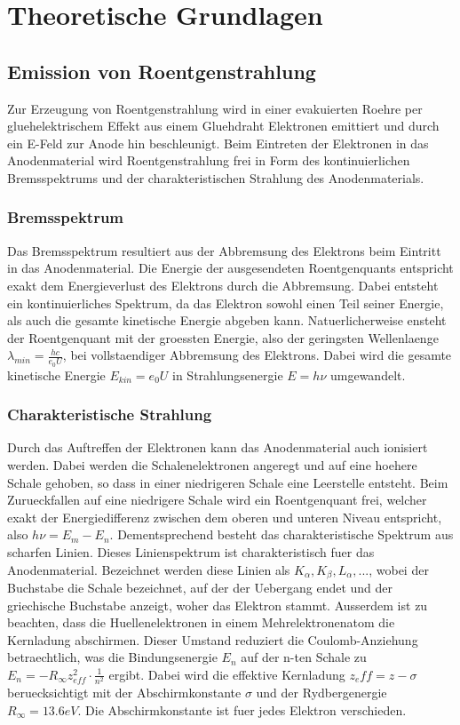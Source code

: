\section{Theoretische Grundlagen}
\subsection{Emission von Roentgenstrahlung}
Zur Erzeugung von Roentgenstrahlung wird in einer evakuierten Roehre per gluehelektrischem Effekt aus einem Gluehdraht Elektronen emittiert und durch ein E-Feld zur Anode hin beschleunigt. Beim Eintreten der Elektronen in das Anodenmaterial wird Roentgenstrahlung frei in Form des kontinuierlichen Bremsspektrums und der charakteristischen Strahlung des Anodenmaterials.
\subsubsection{Bremsspektrum}
Das Bremsspektrum resultiert aus der Abbremsung des Elektrons beim Eintritt in das Anodenmaterial. Die Energie der ausgesendeten Roentgenquants entspricht exakt dem Energieverlust des Elektrons durch die Abbremsung. Dabei entsteht ein kontinuierliches Spektrum, da das Elektron sowohl einen Teil seiner Energie, als auch die gesamte kinetische Energie abgeben kann. Natuerlicherweise ensteht der Roentgenquant mit der groessten Energie, also der geringsten Wellenlaenge $\lambda_{min}=\frac{hc}{e_0U}$, bei vollstaendiger Abbremsung des Elektrons. Dabei wird die gesamte kinetische Energie $E_{kin}=e_0U$ in Strahlungsenergie $E=h\nu$ umgewandelt.
\subsubsection{Charakteristische Strahlung}
Durch das Auftreffen der Elektronen kann das Anodenmaterial auch ionisiert werden. Dabei werden die Schalenelektronen angeregt und auf eine hoehere Schale gehoben, so dass in einer niedrigeren Schale eine Leerstelle entsteht. Beim Zurueckfallen auf eine niedrigere Schale wird ein Roentgenquant frei, welcher exakt der Energiedifferenz zwischen dem oberen und unteren Niveau entspricht, also $h\nu=E_m-E_n$. Dementsprechend besteht das charakteristische Spektrum aus scharfen Linien. Dieses Linienspektrum ist charakteristisch fuer das Anodenmaterial. Bezeichnet werden diese Linien als $K_\alpha, K_\beta, L_\alpha,...$, wobei der Buchstabe die Schale bezeichnet, auf der der Uebergang endet und der griechische Buchstabe anzeigt, woher das Elektron stammt. Ausserdem ist zu beachten, dass die Huellenelektronen in einem Mehrelektronenatom die Kernladung abschirmen. Dieser Umstand reduziert die Coulomb-Anziehung betraechtlich, was die Bindungsenergie $E_n$ auf der n-ten Schale zu $E_n=-R_{\infty}z^2_{eff}\cdot\frac{1}{n^2}$ ergibt. Dabei wird die effektive Kernladung $z_eff=z-\sigma$ beruecksichtigt mit der Abschirmkonstante $\sigma$ und der Rydbergenergie $R_{\infty}=13.6eV$. Die Abschirmkonstante ist fuer jedes Elektron verschieden.

